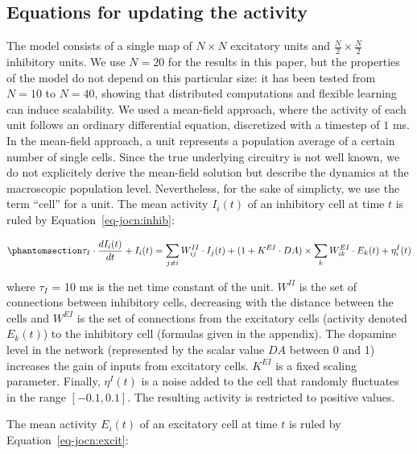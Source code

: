 \documentclass[
  11pt,
  a4paper,
]{scrbook}
\begin{document}
\subsection{Equations for updating the
activity}\label{equations-for-updating-the-activity}

The model consists of a single map of \(N \times N\) excitatory units
and \(\frac{N}{2} \times \frac{N}{2}\) inhibitory units. We use
\(N = 20\) for the results in this paper, but the properties of the
model do not depend on this particular size: it has been tested from
\(N=10\) to \(N=40\), showing that distributed computations and flexible
learning can induce scalability. We used a mean-field approach, where
the activity of each unit follows an ordinary differential equation,
discretized with a timestep of \(1\) ms. In the mean-field approach, a
unit represents a population average of a certain number of single
cells. Since the true underlying circuitry is not well known, we do not
explicitely derive the mean-field solution but describe the dynamics at
the macroscopic population level. Nevertheless, for the sake of
simplicty, we use the term ``cell'' for a unit. The mean activity
\(I_i (t)\) of an inhibitory cell at time \(t\) is ruled by
Equation~\ref{eq-jocn:inhib}:

\begin{equation}\phantomsection\label{eq-jocn:inhib}{
    \tau_I \cdot \frac{d I_i (t)}{d t} + I_i (t) = \sum_{j \neq i} W^{II}_{i j} \cdot I_j (t) + ( 1 + K^{EI} \cdot DA ) \times \sum_{k} W^{EI}_{i k} \cdot E_k (t) +\eta^I_i (t)
}\end{equation}

where \(\tau_I\) = 10 ms is the net time constant of the unit.
\(W^{II}\) is the set of connections between inhibitory cells,
decreasing with the distance between the cells and \(W^{EI}\) is the set
of connections from the excitatory cells (activity denoted \(E_k (t)\))
to the inhibitory cell (formulas given in the appendix). The dopamine
level in the network (represented by the scalar value \(DA\) between 0
and 1) increases the gain of inputs from excitatory cells. \(K^{EI}\) is
a fixed scaling parameter. Finally, \(\eta^I (t)\) is a noise added to
the cell that randomly fluctuates in the range \([- 0.1, 0.1]\). The
resulting activity is restricted to positive values.

The mean activity \(E_i (t)\) of an excitatory cell at time \(t\) is
ruled by Equation~\ref{eq-jocn:excit}:
\end{document}
